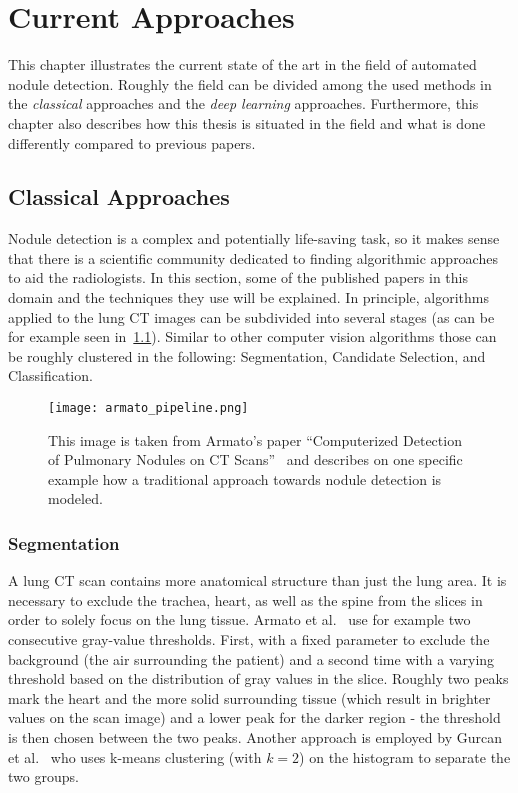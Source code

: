 \documentclass[main.tex]{subfiles}
\begin{document}
\chapter{Current Approaches}\label{chap:approaches}
This chapter illustrates the current state of the art in the field of automated nodule detection. Roughly the field can be divided among the used methods in the \emph{classical} approaches and the \emph{deep learning} approaches. Furthermore, this chapter also describes how this thesis is situated in the field and what is done differently compared to previous papers.

\section{Classical Approaches}
Nodule detection is a complex and potentially life-saving task, so it makes sense that there is a scientific community dedicated to finding algorithmic approaches to aid the radiologists. In this section, some of the published papers in this domain and the techniques they use will be explained. In principle, algorithms applied to the lung CT images can be subdivided into several stages (as can be for example seen in~\ref{fig:pipeline}). Similar to other computer vision algorithms those can be roughly clustered in the following: Segmentation, Candidate Selection, and Classification.


\begin{figure}[ht]
\centering
\texttt{[image: armato\_pipeline.png]}
\caption{This image is taken from Armato's paper ``Computerized Detection
of Pulmonary Nodules on CT Scans''~\cite{armato1999computerized} and describes on one specific example how a traditional approach towards nodule detection is modeled.}
\label{fig:pipeline}
\end{figure}


\subsection{Segmentation}
A lung CT scan contains more anatomical structure than just the lung area. It is necessary to exclude the trachea, heart, as well as the spine from the slices in order to solely focus on the lung tissue. Armato et al.~\cite{armato1999computerized,armato2001automated} use for example two consecutive gray-value thresholds. First, with a fixed parameter to exclude the background (the air surrounding the patient) and a second time with a varying threshold based on the distribution of gray values in the slice. Roughly two peaks mark the heart and the more solid surrounding tissue (which result in brighter values on the scan image) and a lower peak for the darker region - the threshold is then chosen between the two peaks. Another approach is employed by Gurcan et al.~\cite{gurcan2002lung} who uses k-means clustering (with $k=2$) on the histogram to separate the two groups. 
\end{document}
